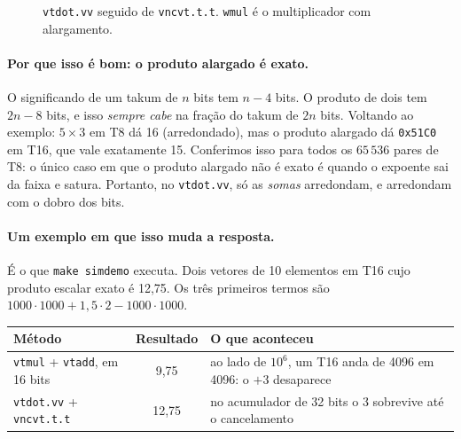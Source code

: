 \documentclass[11pt,a4paper]{article}
\newcommand{\code}[1]{\texttt{#1}}
\begin{document}
\begin{figure}[H]
\centering
{}
\caption{\code{vtdot.vv} seguido de \code{vncvt.t.t}. \code{wmul} é o multiplicador com alargamento.}
\end{figure}

\paragraph{Por que isso é bom: o produto alargado é exato.} O significando de um takum de $n$ bits tem
$n-4$ bits. O produto de dois tem $2n-8$ bits, e isso \emph{sempre cabe} na fração do takum de $2n$ bits.
Voltando ao exemplo: $5\times3$ em T8 dá 16 (arredondado), mas o produto alargado dá \code{0x51C0} em T16,
que vale exatamente 15. Conferimos isso para todos os $65\,536$ pares de T8: o único caso em que o produto
alargado não é exato é quando o expoente sai da faixa e satura. Portanto, no \code{vtdot.vv}, só as
\emph{somas} arredondam, e arredondam com o dobro dos bits.

\paragraph{Um exemplo em que isso muda a resposta.} É o que \code{make simdemo} executa. Dois vetores de
10 elementos em T16 cujo produto escalar exato é 12,75. Os três primeiros termos são
$1000\cdot1000 + 1{,}5\cdot2 - 1000\cdot1000$.

\begin{center}
\begin{tabularx}{\linewidth}{lcX}
\toprule
Método & Resultado & O que aconteceu \\
\midrule
\code{vtmul} + \code{vtadd}, em 16 bits & 9,75 & ao lado de $10^6$, um T16 anda de 4096 em 4096:
 o $+3$ desaparece \\
\code{vtdot.vv} + \code{vncvt.t.t} & 12,75 & no acumulador de 32 bits o 3 sobrevive até o
 cancelamento \\
\bottomrule
\end{tabularx}
\end{center}
\end{document}
